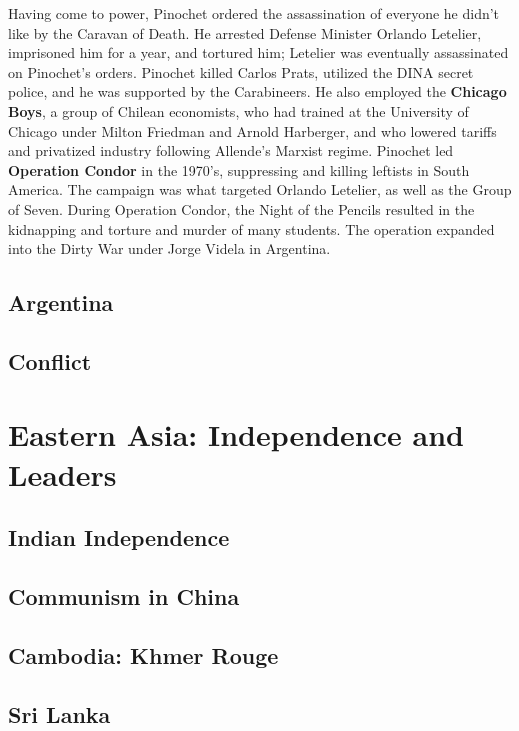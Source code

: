 Having come to power, Pinochet ordered the assassination of everyone he didn't like by the Caravan of Death.
He arrested Defense Minister Orlando Letelier, imprisoned him for a year, and tortured him;
Letelier was eventually assassinated on Pinochet's orders.
Pinochet killed Carlos Prats, utilized the DINA secret police, and he was supported by the Carabineers.
He also employed the \textbf{Chicago Boys}, a group of Chilean economists,
who had trained at the University of Chicago under Milton Friedman and Arnold Harberger,
and who lowered tariffs and privatized industry following Allende's Marxist regime.
Pinochet led \textbf{Operation Condor} in the 1970's, suppressing and killing leftists in South America.
The campaign was what targeted Orlando Letelier, as well as the Group of Seven.
During Operation Condor, the Night of the Pencils resulted in the kidnapping and torture and murder of many students.
The operation expanded into the Dirty War under Jorge Videla in Argentina.

\subsection*{Argentina}

\subsection*{Conflict}

\section{Eastern Asia: Independence and Leaders}

\subsection*{Indian Independence}

\subsection*{Communism in China}

\subsection*{Cambodia: Khmer Rouge}

\subsection*{Sri Lanka}

